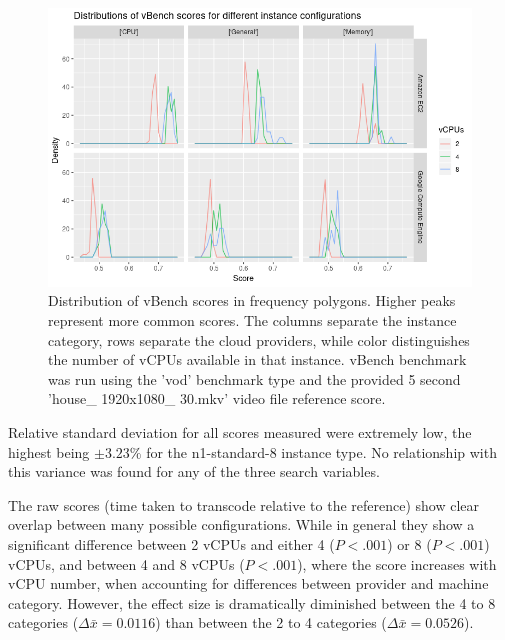\documentclass{report}
\begin{document}
\begin{figure}[!ht]
  \centering
   \includegraphics[scale=0.7]{vbench_dists}
   \caption{Distribution of vBench scores in frequency polygons. Higher peaks represent more common scores. The columns separate the instance category, rows separate the cloud providers, while color distinguishes the number of vCPUs available in that instance. vBench benchmark was run using the 'vod' benchmark type and the provided 5 second 'house\_ 1920x1080\_ 30.mkv' video file reference score.}
  \label{fig:vbench-dists}
\end{figure}


Relative standard deviation for all scores measured were extremely low, the highest being $\pm 3.23\%$ for the n1-standard-8 instance type. No relationship with this variance was found for any of the three search variables.

The raw scores (time taken to transcode relative to the reference) show clear overlap between many possible configurations. While in general they show a significant difference between 2 vCPUs and either 4 ($P < .001$) or 8 ($P < .001$) vCPUs, and between 4 and 8 vCPUs ($P < .001$), where the score increases with vCPU number, when accounting for differences between provider and machine category. However, the effect size is dramatically diminished between the 4 to 8 categories ($\Delta \bar{x} = 0.0116$) than between the 2 to 4 categories ($\Delta \bar{x} = 0.0526$).
\end{document}
